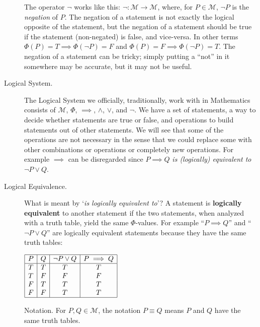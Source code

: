 \documentclass[10pt, AMS Euler]{article}
\begin{document}
\begin{description}
The operator $\neg$ works like this: $\neg : \mathcal{M} \to \mathcal{M}$, where, for $P \in \mathcal{M}$, $\neg P$ is the \emph{negation} of $P$.  
The negation of a statement is not exactly the logical opposite of the statement, but the negation of a statement should be true if the statement (non-negated) 
is false, and vice-versa.  In other terms $\Phi(P) = T \implies \Phi(\neg P) = F$ and $\Phi(P) = F \implies \Phi(\neg P) = T$.  
The negation of a statement can be tricky; simply putting a ``not'' in it somewhere may be accurate, but it may not be useful. 

\item[Logical System.]  The Logical System we officially, traditionally, work with in Mathematics consists of $\mathcal{M}$, $\Phi$, $\implies$, $\wedge$, $\vee$, and $\neg$.
We have a set of statements, a way to decide whether statements are true or false, and operations to build statements out of other statements.
We will see that some of the operations are not necessary in the sense that we could replace some with other combinations or operations or completely new operations.  
For example $\implies$ can be disregarded since $P \implies Q$ \emph{is (logically) equivalent to} $\neg P \vee Q$.  

\item[Logical Equivalence.]  \textsf{What is meant by `\emph{is logically equivalent to}'?}  A statement is {\bf logically equivalent} to another statement if 
the two statements, when analyzed with a truth table, yield the same $\Phi$-values.  For example ``$P \implies Q$'' and ``$\neg P \vee Q$'' are logically equivalent 
statements because they have the same truth tables:

\begin{center}
$\begin{array}{|c|c|c|c|} \hline P & Q & \neg P \vee Q & P \implies Q \\
\hline
T & T & T & T \\
T & F & F & F \\
F & T & T & T  \\
F & F & T & T \\\hline
\end{array}$
\end{center}

\textsf{Notation.}  For $P, Q \in \mathcal{M}$, the notation $P \equiv Q$ means $P$ and $Q$ have the same truth tables. 


\end{description}
\end{document}

